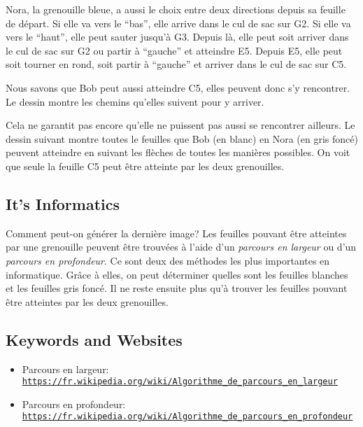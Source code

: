 \documentclass[a4paper,11pt]{report}
\newcommand{\BrochureUrlText}[1]{\texttt{#1}}
\newcommand{\taskGraphicsFolder}{..}
\begin{document}
Nora, la grenouille bleue, a aussi le choix entre deux directions depuis sa feuille de départ. Si elle va vers le “bas”, elle arrive dans le cul de sac sur G2. Si elle va vers le “haut”, elle peut sauter jusqu’à G3. Depuis là, elle peut soit arriver dans le cul de sac sur G2 ou partir à “gauche” et atteindre E5. Depuis E5, elle peut soit tourner en rond, soit partir à “gauche” et arriver dans le cul de sac sur C5.

Nous savons que Bob peut aussi atteindre C5, elles peuvent donc s’y rencontrer. Le dessin montre les chemins qu’elles suivent pour y arriver.

{\centering%
\par}

Cela ne garantit pas encore qu’elle ne puissent pas aussi se rencontrer ailleurs. Le dessin suivant montre toutes le feuilles que Bob (en blanc) en Nora (en gris foncé) peuvent atteindre en suivant les flèches de toutes les manières possibles. On voit que seule la feuille C5 peut être atteinte par les deux grenouilles.

{\centering%
\par}


\subsection*{It’s Informatics}

Comment peut-on générer la dernière image? Les feuilles pouvant être atteintes par une grenouille peuvent être trouvées à l’aide d’un \emph{parcours en largeur} ou d’un \emph{parcours en profondeur}. Ce sont deux des méthodes les plus importantes en informatique. Grâce à elles, on peut déterminer quelles sont les feuilles blanches et les feuilles gris foncé. Il ne reste ensuite plus qu’à trouver les feuilles pouvant être atteintes par les deux grenouilles.

{\raggedright

\subsection*{Keywords and Websites}

\begin{itemize}
  \item Parcours en largeur: \href{https://fr.wikipedia.org/wiki/Algorithme_de_parcours_en_largeur}{\BrochureUrlText{https://fr.wikipedia.org/wiki/Algorithme\_de\_parcours\_en\_largeur}}
  \item Parcours en profondeur: \href{https://fr.wikipedia.org/wiki/Algorithme_de_parcours_en_profondeur}{\BrochureUrlText{https://fr.wikipedia.org/wiki/Algorithme\_de\_parcours\_en\_profondeur}}
\end{itemize}


}
\end{document}
